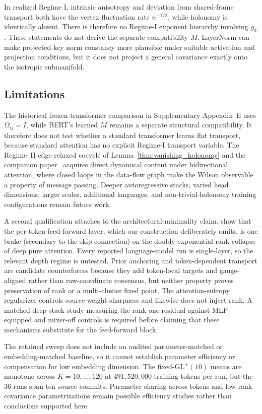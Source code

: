 \documentclass[twoside,11pt]{article}
\begin{document}
In realized Regime I, intrinsic anisotropy and deviation from shared-frame transport both have the vertex-fluctuation rate $n^{-1/2}$, while holonomy is identically absent. There is therefore no Regime-I exponent hierarchy involving $g_3$. These statements do not derive the separate compatibility $M$. LayerNorm can make projected-key norm constancy more plausible under suitable activation and projection conditions, but it does not project a general covariance exactly onto the isotropic submanifold.
\subsection{Limitations}
\label{sec:limitations}

The historical frozen-transformer comparison in Supplementary Appendix~E uses $\Omega_{ij}=I$, while BERT's learned $M$ remains a separate structural compatibility. It therefore does not test whether a standard transformer learns flat transport, because standard attention has no explicit Regime-I transport variable. The Regime~II edge-relaxed cocycle of Lemma~\ref{thm:vanishing_holonomy} and the companion paper~\cite{Dennis2025it} acquires direct dynamical content under bidirectional attention, where closed loops in the data-flow graph make the Wilson observable a property of message passing. Deeper autoregressive stacks, varied head dimensions, larger scales, additional languages, and non-trivial-holonomy training configurations remain future work.

A second qualification attaches to the architectural-minimality claim. \citet{dong2021attention} show that the per-token feed-forward layer, which our construction deliberately omits, is one brake (secondary to the skip connection) on the doubly exponential rank collapse of deep pure attention. Every reported language-model run is single-layer, so the relevant depth regime is untested. Prior anchoring and token-dependent transport are candidate counterforces because they add token-local targets and gauge-aligned rather than raw-coordinate consensus, but neither property proves preservation of rank or a multi-cluster fixed point. The attention-entropy regularizer controls source-weight sharpness and likewise does not inject rank. A matched deep-stack study measuring the rank-one residual against MLP-equipped and mixer-off controls is required before claiming that these mechanisms substitute for the feed-forward block.

The retained sweep does not include an audited parameter-matched or embedding-matched baseline, so it cannot establish parameter efficiency or compensation for low embedding dimension. The fixed-$\mathrm{GL}^+(10)$ means are monotone across $K=10,\ldots,120$ at $491{,}520{,}000$ training tokens per run, but the 36 runs span ten source commits. Parameter sharing across tokens and low-rank covariance parametrizations remain possible efficiency studies rather than conclusions supported here.
\end{document}
